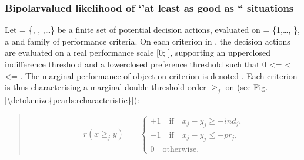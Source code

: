 \documentclass[a4paper,12pt,english]{sphinxhowto}
\begin{document}
\subsubsection{Bipolar\sphinxhyphen{}valued likelihood of ‘’at least as good as “ situations}
\label{\detokenize{pearls:bipolar-valued-likelihood-of-at-least-as-good-as-situations}}
\sphinxAtStartPar
Let  = \{, , ,…\} be a finite set of  potential decision actions, evaluated on  = \{1,…, \}, a  and  family of  performance criteria. On each criterion  in , the decision actions are evaluated on a real performance scale {[}0;  {]}, supporting an upper\sphinxhyphen{}closed indifference threshold  and a lower\sphinxhyphen{}closed preference threshold  such that 0 \textless{}=  \textless{}  \textless{}= . The marginal performance of object  on criterion  is denoted . Each criterion  is thus characterising a marginal double threshold order \(\geq_j\) on  (see \hyperref[\detokenize{pearls:rcharacteristic}]{Fig.\@ \ref{\detokenize{pearls:rcharacteristic}}}):
\begin{quote}
\begin{equation*}
\begin{split}r(x \geq_j y) \; = \; \begin{cases} +1 \quad \text{if} \quad x_j - y_j \geq -ind_j,\\  -1 \quad \text{if} \quad x_j - y_j \leq -pr_j,\\ 0 \quad \text{otherwise}. \end{cases}\end{split}
\end{equation*}\end{quote}
\end{document}
